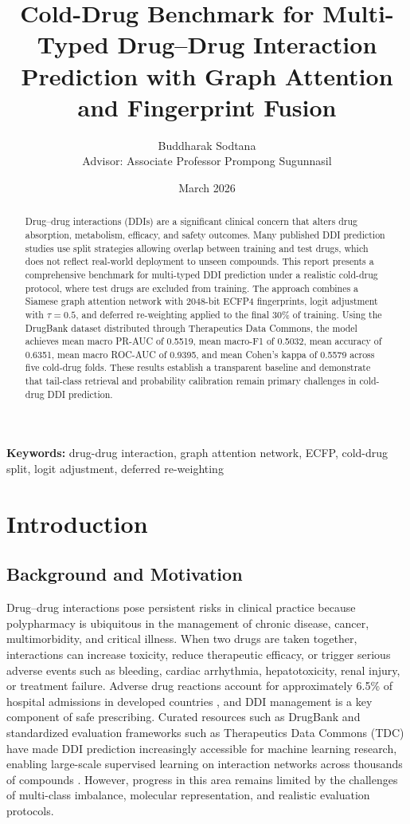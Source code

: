 \documentclass[11pt,a4paper]{report}
\title{Cold-Drug Benchmark for Multi-Typed Drug–Drug Interaction Prediction with Graph Attention and Fingerprint Fusion}
\author{Buddharak Sodtana\\[1em]Advisor: Associate Professor Prompong Sugunnasil}
\date{March 2026}
\begin{document}
\maketitle
{}
\begin{abstract}
Drug--drug interactions (DDIs) are a significant clinical concern that alters drug absorption, metabolism, efficacy, and safety outcomes. Many published DDI prediction studies use split strategies allowing overlap between training and test drugs, which does not reflect real-world deployment to unseen compounds. This report presents a comprehensive benchmark for multi-typed DDI prediction under a realistic cold-drug protocol, where test drugs are excluded from training. The approach combines a Siamese graph attention network with 2048-bit ECFP4 fingerprints, logit adjustment with \(\tau = 0.5\), and deferred re-weighting applied to the final 30\% of training. Using the DrugBank dataset distributed through Therapeutics Data Commons, the model achieves mean macro PR-AUC of 0.5519, mean macro-F1 of 0.5032, mean accuracy of 0.6351, mean macro ROC-AUC of 0.9395, and mean Cohen's kappa of 0.5579 across five cold-drug folds. These results establish a transparent baseline and demonstrate that tail-class retrieval and probability calibration remain primary challenges in cold-drug DDI prediction.
\end{abstract}

\noindent\textbf{Keywords:} drug-drug interaction, graph attention network, ECFP, cold-drug split, logit adjustment, deferred re-weighting

\tableofcontents
\clearpage
{}
\chapter{Introduction}
\section{Background and Motivation}
Drug--drug interactions pose persistent risks in clinical practice because polypharmacy is ubiquitous in the management of chronic disease, cancer, multimorbidity, and critical illness. When two drugs are taken together, interactions can increase toxicity, reduce therapeutic efficacy, or trigger serious adverse events such as bleeding, cardiac arrhythmia, hepatotoxicity, renal injury, or treatment failure. Adverse drug reactions account for approximately 6.5\% of hospital admissions in developed countries \cite{wishart2018drugbank}, and DDI management is a key component of safe prescribing. Curated resources such as DrugBank and standardized evaluation frameworks such as Therapeutics Data Commons (TDC) have made DDI prediction increasingly accessible for machine learning research, enabling large-scale supervised learning on interaction networks across thousands of compounds \cite{wishart2018drugbank, huang2021tdc}. However, progress in this area remains limited by the challenges of multi-class imbalance, molecular representation, and realistic evaluation protocols.
\end{document}
